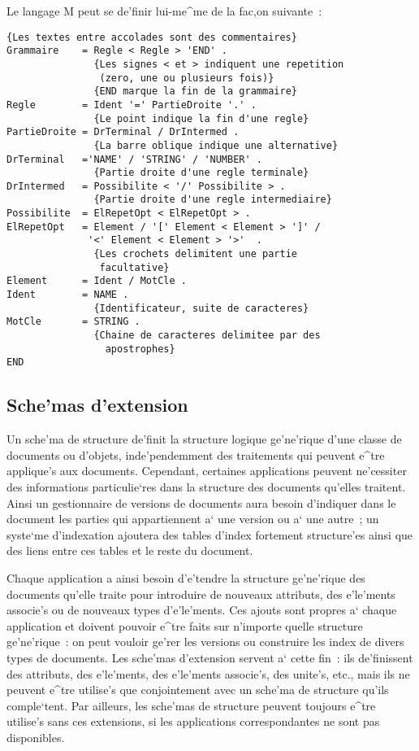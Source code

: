 Le langage M peut se de'finir lui-me^me de la fac,on suivante~:

\begin{verbatim}
{Les textes entre accolades sont des commentaires}
Grammaire    = Regle < Regle > 'END' .
               {Les signes < et > indiquent une repetition
                (zero, une ou plusieurs fois)}
               {END marque la fin de la grammaire}
Regle        = Ident '=' PartieDroite '.' .
               {Le point indique la fin d'une regle}
PartieDroite = DrTerminal / DrIntermed .
               {La barre oblique indique une alternative}
DrTerminal   ='NAME' / 'STRING' / 'NUMBER' .
               {Partie droite d'une regle terminale}
DrIntermed   = Possibilite < '/' Possibilite > .
               {Partie droite d'une regle intermediaire}
Possibilite  = ElRepetOpt < ElRepetOpt > .
ElRepetOpt   = Element / '[' Element < Element > ']' /
              '<' Element < Element > '>'  .
               {Les crochets delimitent une partie
                facultative}
Element      = Ident / MotCle .
Ident        = NAME .
               {Identificateur, suite de caracteres}
MotCle       = STRING .
               {Chaine de caracteres delimitee par des
                 apostrophes}
END
\end{verbatim}

\subsection{Sche'mas d'extension}
\label{schext}

Un sche'ma de structure de'finit la structure logique ge'ne'rique d'une
classe de documents ou d'objets, inde'pendemment des traitements qui peuvent
e^tre applique's aux documents. Cependant, certaines applications peuvent
ne'cessiter des informations particulie`res dans la structure des
documents qu'elles traitent. Ainsi un gestionnaire
de versions de documents aura besoin d'indiquer dans le document les parties
qui appartiennent a` une version ou a` une autre~; un syste`me d'indexation
ajoutera des tables d'index fortement structure'es ainsi que des liens entre
ces tables et le reste du document.

Chaque application a ainsi besoin d'e'tendre la structure ge'ne'rique des
documents qu'elle traite pour introduire de nouveaux attributs, des
e'le'ments associe's ou de nouveaux types d'e'le'ments. Ces ajouts
sont propres a` chaque application et doivent pouvoir e^tre faits sur
n'importe quelle structure ge'ne'rique~: on peut vouloir ge'rer les versions
ou construire les index de divers types de documents. Les sche'mas d'extension
servent a` cette fin~: ils de'finissent des attributs, des e'le'ments, des
e'le'ments associe's, des unite's, etc., mais ils ne peuvent e^tre utilise's
que conjointement avec un sche'ma de structure qu'ils comple`tent.
Par ailleurs, les sche'mas de structure peuvent toujours e^tre utilise's
sans ces extensions, si les applications correspondantes ne sont pas
disponibles.


